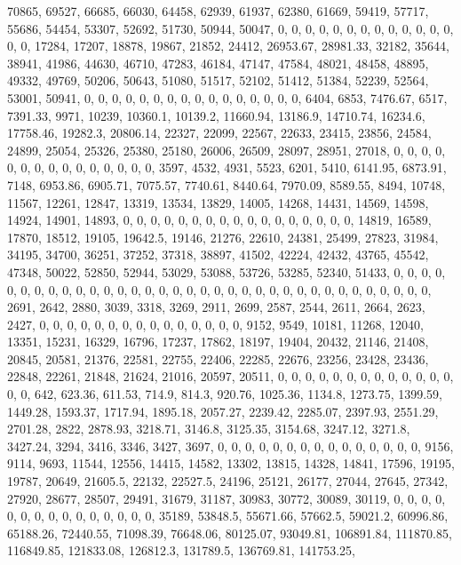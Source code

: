 \documentclass[
]{article}
\begin{document}
70865, 69527, 66685, 66030, 64458, 62939, 61937, 62380, 61669, 59419,
57717, 55686, 54454, 53307, 52692, 51730, 50944, 50047, 0, 0, 0, 0, 0,
0, 0, 0, 0, 0, 0, 0, 0, 0, 0, 17284, 17207, 18878, 19867, 21852, 24412,
26953.67, 28981.33, 32182, 35644, 38941, 41986, 44630, 46710, 47283,
46184, 47147, 47584, 48021, 48458, 48895, 49332, 49769, 50206, 50643,
51080, 51517, 52102, 51412, 51384, 52239, 52564, 53001, 50941, 0, 0, 0,
0, 0, 0, 0, 0, 0, 0, 0, 0, 0, 0, 0, 0, 6404, 6853, 7476.67, 6517,
7391.33, 9971, 10239, 10360.1, 10139.2, 11660.94, 13186.9, 14710.74,
16234.6, 17758.46, 19282.3, 20806.14, 22327, 22099, 22567, 22633, 23415,
23856, 24584, 24899, 25054, 25326, 25380, 25180, 26006, 26509, 28097,
28951, 27018, 0, 0, 0, 0, 0, 0, 0, 0, 0, 0, 0, 0, 0, 0, 0, 3597, 4532,
4931, 5523, 6201, 5410, 6141.95, 6873.91, 7148, 6953.86, 6905.71,
7075.57, 7740.61, 8440.64, 7970.09, 8589.55, 8494, 10748, 11567, 12261,
12847, 13319, 13534, 13829, 14005, 14268, 14431, 14569, 14598, 14924,
14901, 14893, 0, 0, 0, 0, 0, 0, 0, 0, 0, 0, 0, 0, 0, 0, 0, 0, 0, 14819,
16589, 17870, 18512, 19105, 19642.5, 19146, 21276, 22610, 24381, 25499,
27823, 31984, 34195, 34700, 36251, 37252, 37318, 38897, 41502, 42224,
42432, 43765, 45542, 47348, 50022, 52850, 52944, 53029, 53088, 53726,
53285, 52340, 51433, 0, 0, 0, 0, 0, 0, 0, 0, 0, 0, 0, 0, 0, 0, 0, 0, 0,
0, 0, 0, 0, 0, 0, 0, 0, 0, 0, 0, 0, 0, 0, 0, 0, 0, 0, 2691, 2642, 2880,
3039, 3318, 3269, 2911, 2699, 2587, 2544, 2611, 2664, 2623, 2427, 0, 0,
0, 0, 0, 0, 0, 0, 0, 0, 0, 0, 0, 0, 0, 9152, 9549, 10181, 11268, 12040,
13351, 15231, 16329, 16796, 17237, 17862, 18197, 19404, 20432, 21146,
21408, 20845, 20581, 21376, 22581, 22755, 22406, 22285, 22676, 23256,
23428, 23436, 22848, 22261, 21848, 21624, 21016, 20597, 20511, 0, 0, 0,
0, 0, 0, 0, 0, 0, 0, 0, 0, 0, 0, 0, 642, 623.36, 611.53, 714.9, 814.3,
920.76, 1025.36, 1134.8, 1273.75, 1399.59, 1449.28, 1593.37, 1717.94,
1895.18, 2057.27, 2239.42, 2285.07, 2397.93, 2551.29, 2701.28, 2822,
2878.93, 3218.71, 3146.8, 3125.35, 3154.68, 3247.12, 3271.8, 3427.24,
3294, 3416, 3346, 3427, 3697, 0, 0, 0, 0, 0, 0, 0, 0, 0, 0, 0, 0, 0, 0,
0, 9156, 9114, 9693, 11544, 12556, 14415, 14582, 13302, 13815, 14328,
14841, 17596, 19195, 19787, 20649, 21605.5, 22132, 22527.5, 24196,
25121, 26177, 27044, 27645, 27342, 27920, 28677, 28507, 29491, 31679,
31187, 30983, 30772, 30089, 30119, 0, 0, 0, 0, 0, 0, 0, 0, 0, 0, 0, 0,
0, 0, 0, 35189, 53848.5, 55671.66, 57662.5, 59021.2, 60996.86, 65188.26,
72440.55, 71098.39, 76648.06, 80125.07, 93049.81, 106891.84, 111870.85,
116849.85, 121833.08, 126812.3, 131789.5, 136769.81, 141753.25,
\end{document}

